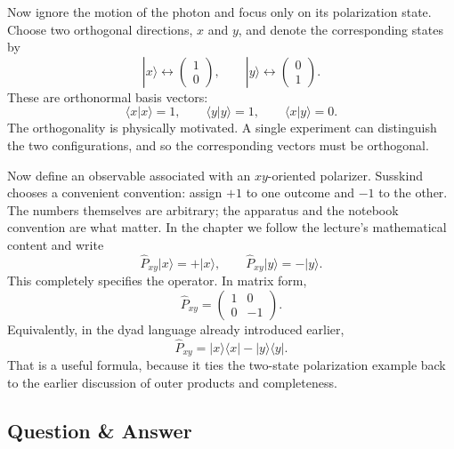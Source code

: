 Now ignore the motion of the photon and focus only on its polarization state. Choose two orthogonal directions, \(x\) and \(y\), and denote the corresponding states by
\begin{equation}
|x\rangle \leftrightarrow
\begin{pmatrix}
1\\
0
\end{pmatrix},
\qquad
|y\rangle \leftrightarrow
\begin{pmatrix}
0\\
1
\end{pmatrix}.
\end{equation}
These are orthonormal basis vectors:
\begin{equation}
\langle x|x\rangle=1,
\qquad
\langle y|y\rangle=1,
\qquad
\langle x|y\rangle=0.
\end{equation}
The orthogonality is physically motivated. A single experiment can distinguish the two configurations, and so the corresponding vectors must be orthogonal.

Now define an observable associated with an \(xy\)-oriented polarizer. Susskind chooses a convenient convention: assign \(+1\) to one outcome and \(-1\) to the other. The numbers themselves are arbitrary; the apparatus and the notebook convention are what matter. In the chapter we follow the lecture's mathematical content and write
\begin{equation}
\hat P_{xy}|x\rangle=+|x\rangle,
\qquad
\hat P_{xy}|y\rangle=-|y\rangle.
\end{equation}
This completely specifies the operator. In matrix form,
\begin{equation}
\hat P_{xy}=
\begin{pmatrix}
1 & 0\\
0 & -1
\end{pmatrix}.
\end{equation}
Equivalently, in the dyad language already introduced earlier,
\begin{equation}
\hat P_{xy}=|x\rangle\langle x|-|y\rangle\langle y|.
\end{equation}
That is a useful formula, because it ties the two-state polarization example back to the earlier discussion of outer products and completeness.

\subsection{Question \& Answer}

